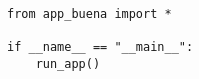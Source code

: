 \begin{lstlisting}

from app_buena import *

if __name__ == "__main__":
    run_app()
    
\end{lstlisting}